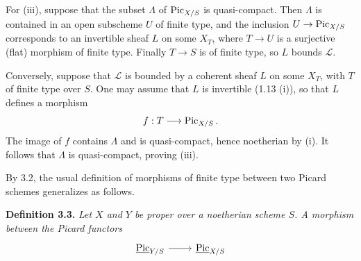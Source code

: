 For (iii), suppose that the subset \(\Lambda\) of \(\operatorname{Pic}_{X/S}\) is
quasi-compact. Then \(\Lambda\) is contained in an open subscheme \(U\)
of finite type, and the inclusion \(U\to\operatorname{Pic}_{X/S}\) corresponds to an
invertible sheaf \(L\) on some \(X_T\), where \(T\to U\) is a surjective
(flat) morphism of finite type. Finally \(T\to S\) is of finite type, so
\(L\) bounds \(\mathscr L\).

Conversely, suppose that \(\mathscr L\) is bounded by a coherent sheaf
\(L\) on some \(X_T\), with \(T\) of finite type over \(S\). One may
assume that \(L\) is invertible (1.13 (i)), so that \(L\) defines a
morphism
\[
f:T\longrightarrow\operatorname{Pic}_{X/S}.
\]
The image of \(f\) contains \(\Lambda\) and is quasi-compact, hence
noetherian by (i). It follows that \(\Lambda\) is quasi-compact, proving
(iii).

By 3.2, the usual definition of morphisms of finite type between two
Picard schemes generalizes as follows.

\textbf{Definition 3.3.} \emph{Let \(X\) and \(Y\) be proper over a
noetherian scheme \(S\). A morphism between the Picard functors}
\[
\begin{tikzcd}
\underline{\Pic}_{Y/S}\arrow[r]&\underline{\Pic}_{X/S}
\end{tikzcd}
\]

